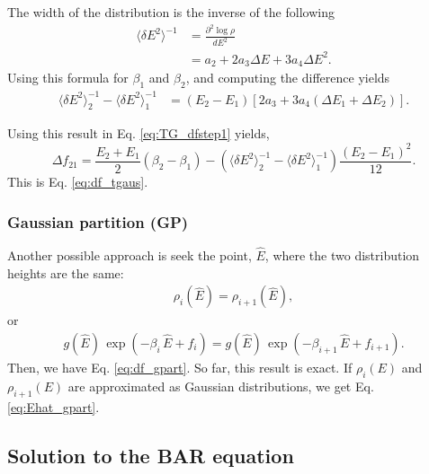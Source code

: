\documentclass[aip,jcp,preprint,notitlepage, superscriptaddress]{revtex4-1}
\begin{document}
The width of the distribution is the inverse
of the following
%
\begin{align*}
\langle \delta E^2 \rangle^{-1}
&=
\frac{ \partial^2 \log \rho } { d E^2 }
\\
&=
a_2 + 2 a_3 \Delta E + 3 a_4 \Delta E^2.
\end{align*}
%
Using this formula for $\beta_1$ and $\beta_2$,
and computing the difference yields
%
\begin{align*}
\langle \delta E^2 \rangle_2^{-1}
-
\langle \delta E^2 \rangle_1^{-1}
&=
(E_2 - E_1) [ 2 a_3  + 3 a_4 (\Delta E_1 + \Delta E_2) ].
\end{align*}



Using this result in Eq. \eqref{eq:TG_dfstep1} yields,
\begin{equation*}
\Delta f_{21}
=
\frac{ E_2 + E_1 } { 2 } (\beta_2 - \beta_1)
-
\left(
  \langle \delta E^2 \rangle_2^{-1}
  -
  \langle \delta E^2 \rangle_1^{-1}
\right)
\frac{ (E_2 - E_1)^2 }{ 12 }.
\end{equation*}
%
This is Eq. \eqref{eq:df_tgaus}.



\subsubsection{Gaussian partition (GP)}



Another possible approach is seek the point, $\hat E$,
where the two distribution heights are the same:
%
\begin{align*}
\rho_i(\hat E)
=
\rho_{i+1}(\hat E),
\end{align*}
%
or
\begin{align*}
g(\hat E) \, \exp(-\beta_i \, \hat E + f_i)
=
g(\hat E) \, \exp(-\beta_{i+1} \, \hat E + f_{i+1}).
\end{align*}
%
Then, we have Eq. \eqref{eq:df_gpart}.
%
So far,
this result is exact.
%
If $\rho_i(E)$ and $\rho_{i+1}(E)$
are approximated as Gaussian distributions,
we get Eq. \eqref{eq:Ehat_gpart}.




\subsection{Solution to the BAR equation}
\end{document}
